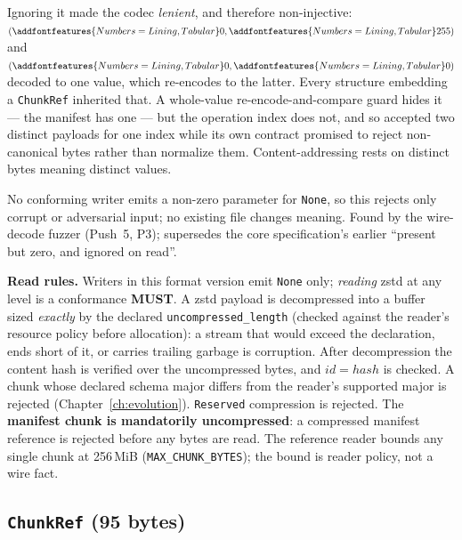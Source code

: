 \documentclass[11pt,letterpaper]{report}
\newcommand{\tablenums}[1]{{\addfontfeatures{Numbers={Lining,Tabular}}#1}}
\newcommand{\MUST}{\textbf{MUST}}
\begin{document}
\begin{rationale}
  Ignoring it made the codec \emph{lenient}, and therefore non-injective:
  $(\tablenums{0}, \tablenums{255})$ and $(\tablenums{0}, \tablenums{0})$
  decoded to one value, which re-encodes to the latter. Every structure
  embedding a \texttt{ChunkRef} inherited that. A whole-value
  re-encode-and-compare guard hides it --- the manifest has one --- but the
  operation index does not, and so accepted two distinct payloads for one index
  while its own contract promised to reject non-canonical bytes rather than
  normalize them. Content-addressing rests on distinct bytes meaning distinct
  values.

  No conforming writer emits a non-zero parameter for \texttt{None}, so this
  rejects only corrupt or adversarial input; no existing file changes meaning.
  Found by the wire-decode fuzzer (Push~5, P3); supersedes the core
  specification's earlier ``present but zero, and ignored on read''.
\end{rationale}

\textbf{Read rules.} Writers in this format version emit \texttt{None} only;
\emph{reading} zstd at any level is a conformance \MUST{}. A zstd payload is
decompressed into a buffer sized \emph{exactly} by the declared
\texttt{uncompressed\_length} (checked against the reader's resource policy
before allocation): a stream that would exceed the declaration, ends short of
it, or carries trailing garbage is corruption. After decompression the
content hash is verified over the uncompressed bytes, and
$\mathit{id} = \mathit{hash}$ is checked. A chunk whose declared schema
major differs from the reader's supported major is rejected
(Chapter~\ref{ch:evolution}). \texttt{Reserved} compression is rejected.
The \textbf{manifest chunk is mandatorily uncompressed}: a compressed
manifest reference is rejected before any bytes are read. The reference
reader bounds any single chunk at 256\,MiB
(\texttt{MAX\_CHUNK\_BYTES}); the bound is reader policy, not a wire fact.

\subsection{\texttt{ChunkRef} (95 bytes)}
\label{sec:bundle:chunkref}
\end{document}
